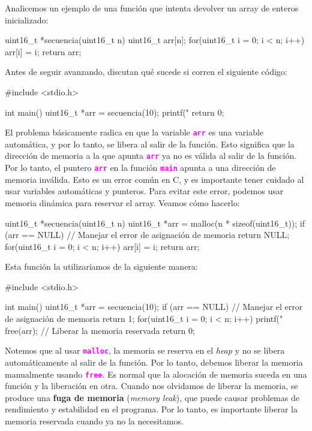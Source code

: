 \documentclass[]{scrartcl}
\newcommand{\hl}[1]{\textcolor{magenta}{\textbf{\texttt{#1}}}}
\begin{document}
Analicemos un ejemplo de una función que intenta devolver un array de enteros inicializado:

\begin{cbox}[]{}
  uint16_t *secuencia(uint16_t n){
    uint16_t arr[n];
    for(uint16_t i = 0; i < n; i++)
      arr[i] = i;
    return arr;
  }
\end{cbox}

\begin{exbox}
Antes de seguir avanzando, discutan qué sucede si corren el siguiente código:
\begin{cbox}[]{}
  #include <stdio.h>

  int main(){
    uint16_t *arr = secuencia(10);
    printf("%
    return 0;
  }
\end{cbox}

\end{exbox}

El problema básicamente radica en que la variable \hl{arr} es una variable automática, y por lo tanto, se libera al salir de la función. Esto significa que la dirección de memoria a la que apunta \hl{arr} ya no es válida al salir de la función. Por lo tanto, el puntero \hl{arr} en la función \hl{main} apunta a una dirección de memoria inválida.
Esto es un error común en C, y es importante tener cuidado al usar variables automáticas y punteros. Para evitar este error, podemos usar memoria dinámica para reservar el array. Veamos cómo hacerlo:
\begin{cbox}[]{}
  uint16_t *secuencia(uint16_t n){
    uint16_t *arr = malloc(n * sizeof(uint16_t));
    if (arr == NULL) {
      // Manejar el error de asignación de memoria
      return NULL;
    }
    for(uint16_t i = 0; i < n; i++)
      arr[i] = i;
    return arr;
  }
\end{cbox}

Esta función la utilizaríamos de la siguiente manera:

\begin{cbox}[]{}
  #include <stdio.h>

  int main(){
    uint16_t *arr = secuencia(10);
    if (arr == NULL) {
      // Manejar el error de asignación de memoria
      return 1;
    }
    for(uint16_t i = 0; i < n; i++)
      printf("%
    free(arr); // Liberar la memoria reservada
    return 0;
  }
\end{cbox}

Notemos que al usar \hl{malloc}, la memoria se reserva en el \textit{heap} y no se libera automáticamente al salir de la función. Por lo tanto, debemos liberar la memoria manualmente usando \hl{free}. Es normal que la alocación de memoria suceda en una función y la liberación en otra. Cuando nos olvidamos de liberar la memoria, se produce una \textbf{fuga de memoria} (\textit{memory leak}), que puede causar problemas de rendimiento y estabilidad en el programa. Por lo tanto, es importante liberar la memoria reservada cuando ya no la necesitamos.
\end{document}
